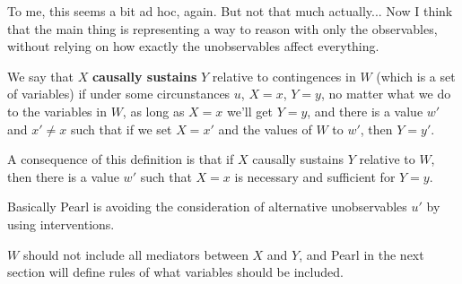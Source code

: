 To me, this seems a bit ad hoc, again. But not that much actually... Now I think that the main thing is representing a way to reason with only the observables, without relying on how exactly the unobservables affect everything.

We say that $X$ \textbf{causally sustains} $Y$ relative to contingences in $W$ (which is a set of variables) if under some circunstances $u$, $X=x$, $Y=y$, no matter what we do to the variables in $W$, as long as $X=x$ we'll get $Y=y$, and there is a value $w'$ and $x'\neq x$ such that if we set $X=x'$ and the values of $W$ to $w'$, then $Y=y'$.

A consequence of this definition is that if $X$ causally sustains $Y$ relative to $W$, then there is a value $w'$ such that $X=x$ is necessary and sufficient for $Y=y$.

Basically Pearl is avoiding the consideration of alternative unobservables $u'$ by using interventions.

$W$ should not include all mediators between $X$ and $Y$, and Pearl in the next section will define rules of what variables should be included.
